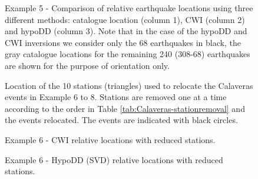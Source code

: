 \documentclass[12pt,double]{article}
\begin{document}
\begin{figure}
\caption{Example 5 - Comparison of relative earthquake locations
using three different methods: catalogue location (column 1), CWI
(column 2) and hypoDD (column 3). Note that in the case of the
hypoDD and CWI inversions we consider only the 68 earthquakes in
black, the gray catalogue locations for the remaining 240 (308-68)
earthquakes are shown for the purpose of orientation only.}
\label{fig-69Calaverasevents_eg1}
\end{figure}

\begin{figure}
\caption{Location
of the 10 stations (triangles) used to relocate the Calaveras events
in Example 6 to 8. Stations are removed one at a time according to
the order in Table \ref{tab:Calaveras-stationremoval} and the events
relocated. The events are indicated with black circles.}
\label{fig:-eqopti-Calaveras-substations}
\end{figure}


\begin{figure}
\caption{Example 6 - CWI relative locations with reduced stations. \hspace{20em}}
\label{fig-CWIreducesstats}
\end{figure}


\begin{figure}
\caption{Example 6 - HypoDD (SVD) relative locations with reduced
stations. \hspace{20em} }
\label{fig-HYPODDreducesstats}
\end{figure}

\end{document}
